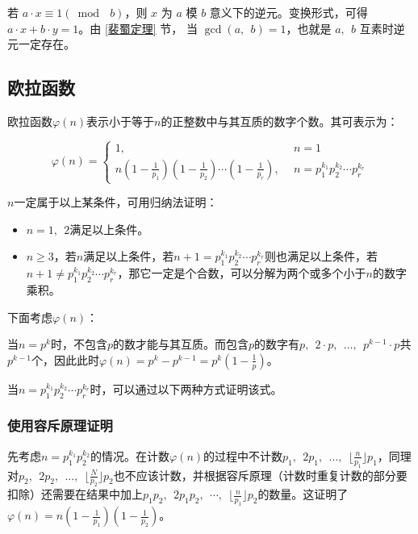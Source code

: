 \documentclass[a4paper]{article}         %
\begin{document}
若 $a \cdot x \equiv 1 (\bmod \phantom{;} b)$，则 $x$ 为 $a$ 模 $b$ 意义下的逆元。变换形式，可得$a \cdot x + b \cdot y = 1$。由 \ref{裴蜀定理} 节， 当 $\gcd(a, \phantom{;} b) = 1$，也就是 $a, \phantom{;} b$ 互素时逆元一定存在。

\subsection{欧拉函数}

欧拉函数$\varphi(n)$表示小于等于$n$的正整数中与其互质的数字个数。其可表示为：

\[
	\varphi(n)=\begin{cases}
		1, \phantom{;}                                                             & n = 1                                          \\
		n(1- \frac{1}{p_1})(1-\frac{1}{p_2}) \cdots (1-\frac{1}{p_r}), \phantom{;} & n = p_{1}^{k_1} p_{2}^{k_2} \cdots p_{r}^{k_r}
	\end{cases}
\]

$n$一定属于以上某条件，可用归纳法证明：

\begin{itemize}
	\item $n=1, \phantom{;} 2$满足以上条件。
	\item $n \geq 3$，若$n$满足以上条件，若$n+1 = p_{1}^{k_1}p_{2}^{k_2}\cdots p_{r}^{k_r}$则也满足以上条件，若$n+1 \neq p_{1}^{k_1}p_{2}^{k_2}\cdots p_{r}^{k_r}$，那它一定是个合数，可以分解为两个或多个小于$n$的数字乘积。
\end{itemize}

下面考虑$\varphi(n)$：

当$n = p^k$时，不包含$p$的数才能与其互质。而包含$p$的数字有$p, \phantom{;}2\cdot p, \phantom{;}\ldots , \phantom{;}p^{k-1}\cdot p$共$p^{k-1}$个，因此此时$\varphi(n) = p^k - p^{k-1} = p^k (1 - \frac{1}{p} )$。

当$n = p_{1}^{k_1}p_{2}^{k_2}\cdots p_{r}^{k_r}$时，可以通过以下两种方式证明该式。

\subsubsection{使用容斥原理证明}

\begin{sloppypar}
	先考虑$n = p_{1}^{k_1}p_{2}^{k_2}$的情况。在计数$\varphi(n)$的过程中不计数$p_1, \phantom{;} 2p_1, \phantom{;} \ldots, \phantom{;} \lfloor \frac{n}{p_1} \rfloor p_1$，同理对$p_2, \phantom{;} 2p_2, \phantom{;} \ldots, \phantom{;} \lfloor \frac{N}{p_2} \rfloor p_2$也不应该计数，并根据容斥原理（计数时重复计数的部分要扣除）还需要在结果中加上$p_1p_2, \phantom{;} 2p_1p_2, \phantom{;} \cdots, \phantom{;} \lfloor \frac{n}{p_1} \rfloor p_2$的数量。这证明了$\varphi(n)=n(1-\frac{1}{p_1})(1-\frac{1}{p_2})$。
\end{sloppypar}
\end{document}
